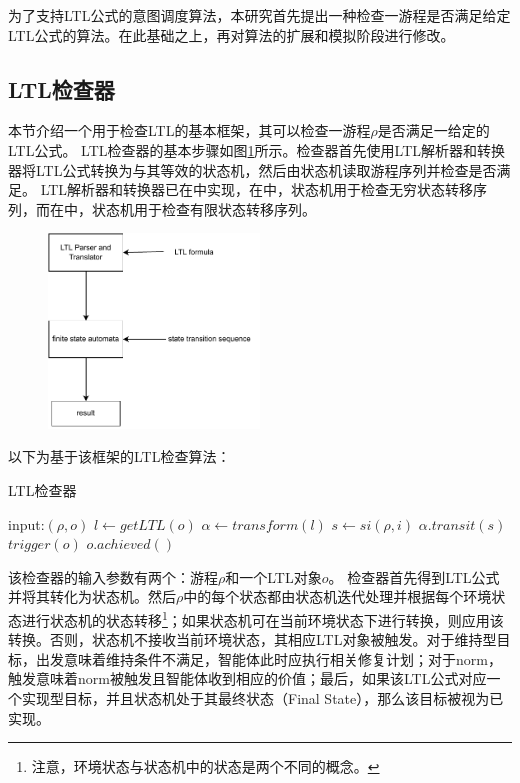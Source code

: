 为了支持LTL公式的意图调度算法，本研究首先提出一种检查一游程是否满足给定LTL公式的算法。在此基础之上，再对\SA 算法的扩展和模拟阶段进行修改。

\subsection{LTL检查器}
本节介绍一个用于检查LTL的基本框架，其可以检查一游程$\rho$是否满足一给定的LTL公式。
LTL检查器的基本步骤如图\ref{fig:translator}所示。检查器首先使用LTL解析器和转换器将LTL公式转换为与其等效的状态机，然后由状态机读取游程序列并检查是否满足。
LTL解析器和转换器已在\cite{DBLP:books/daglib/0020982,DBLP:journals/jlap/HuangC22}中实现，在\cite{DBLP:books/daglib/0020982}中，状态机用于检查无穷状态转移序列，而在\cite{DBLP:journals/jlap/HuangC22}中，状态机用于检查有限状态转移序列。

\begin{figure}[htb]
\centering
\includegraphics[width=0.5\textwidth]{./figs/translator}
\label{fig:translator}
\end{figure}

以下为基于该框架的LTL检查算法：
\begin{algorithm} %
\caption{LTL检查器}\label{checker}
\begin{algorithmic}[1]
\STATE input:$(\rho, o)$
\STATE $l \gets getLTL(o)$
\STATE $\alpha \gets transform(l)$ 
  \STATE $s \gets si(\rho, i)$
    \STATE $\alpha.transit(s)$
    \ELSE
    \STATE $trigger(o)$
  \ENDIF
\ENDFOR
{}
  \STATE $o.achieved()$
\ENDIF
\end{algorithmic}
\end{algorithm}
该检查器的输入参数有两个：游程$\rho$和一个LTL对象$o$。
%
检查器首先得到LTL公式并将其转化为状态机。然后$\rho$中的每个状态都由状态机迭代处理并根据每个环境状态进行状态机的状态转移\footnote{注意，环境状态与状态机中的状态是两个不同的概念。}；如果状态机可在当前环境状态下进行转换，则应用该转换。否则，状态机不接收当前环境状态，其相应LTL对象被触发。对于维持型目标，出发意味着维持条件不满足，智能体此时应执行相关修复计划；对于norm，触发意味着norm被触发且智能体收到相应的价值；最后，如果该LTL公式对应一个实现型目标，并且状态机处于其最终状态（Final State），那么该目标被视为已实现。

